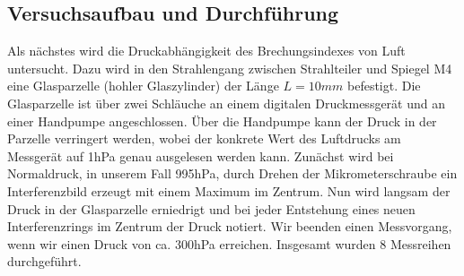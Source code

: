 \documentclass[12pt,a4paper]{article}
\begin{document}
\subsection{Versuchsaufbau und Durchführung}
Als nächstes wird die Druckabhängigkeit des Brechungsindexes von Luft untersucht. Dazu wird in den Strahlengang zwischen Strahlteiler und Spiegel M4 eine Glasparzelle (hohler Glaszylinder) der Länge $L=10mm$ befestigt. Die Glasparzelle ist über zwei Schläuche an einem digitalen Druckmessgerät und an einer Handpumpe angeschlossen. Über die Handpumpe kann der Druck in der Parzelle verringert werden, wobei der konkrete Wert des Luftdrucks am Messgerät auf 1hPa genau ausgelesen werden kann. Zunächst wird bei Normaldruck, in unserem Fall 995hPa, durch Drehen der Mikrometerschraube ein Interferenzbild erzeugt mit einem Maximum im Zentrum. Nun wird langsam der Druck in der Glasparzelle erniedrigt und bei jeder Entstehung eines neuen Interferenzrings im Zentrum der Druck notiert. Wir beenden einen Messvorgang, wenn wir einen Druck von ca. 300hPa erreichen. Insgesamt wurden 8 Messreihen durchgeführt.
\end{document}
